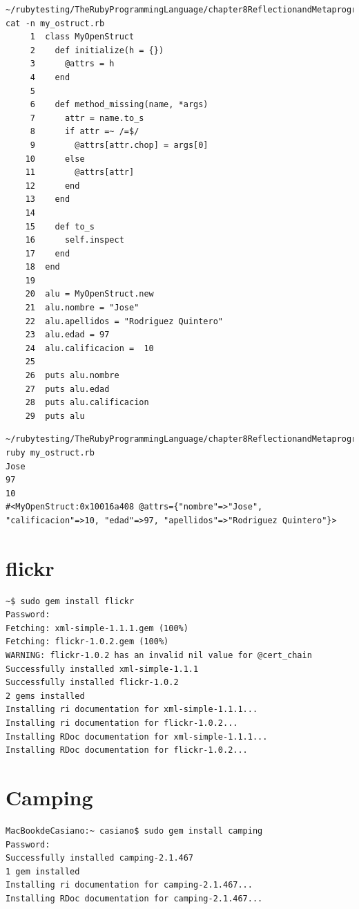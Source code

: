 \begin{verbatim}
~/rubytesting/TheRubyProgrammingLanguage/chapter8ReflectionandMetaprogramming$ cat -n my_ostruct.rb 
     1  class MyOpenStruct
     2    def initialize(h = {})
     3      @attrs = h
     4    end
     5  
     6    def method_missing(name, *args)
     7      attr = name.to_s
     8      if attr =~ /=$/
     9        @attrs[attr.chop] = args[0]
    10      else
    11        @attrs[attr]
    12      end
    13    end
    14  
    15    def to_s
    16      self.inspect
    17    end
    18  end
    19  
    20  alu = MyOpenStruct.new
    21  alu.nombre = "Jose"
    22  alu.apellidos = "Rodriguez Quintero"
    23  alu.edad = 97
    24  alu.calificacion =  10
    25  
    26  puts alu.nombre
    27  puts alu.edad
    28  puts alu.calificacion
    29  puts alu
\end{verbatim}

\begin{verbatim}
~/rubytesting/TheRubyProgrammingLanguage/chapter8ReflectionandMetaprogramming$ ruby my_ostruct.rb 
Jose
97
10
#<MyOpenStruct:0x10016a408 @attrs={"nombre"=>"Jose", "calificacion"=>10, "edad"=>97, "apellidos"=>"Rodriguez Quintero"}>
\end{verbatim}

\section{flickr}

\begin{verbatim}
~$ sudo gem install flickr
Password:
Fetching: xml-simple-1.1.1.gem (100%)
Fetching: flickr-1.0.2.gem (100%)
WARNING: flickr-1.0.2 has an invalid nil value for @cert_chain
Successfully installed xml-simple-1.1.1
Successfully installed flickr-1.0.2
2 gems installed
Installing ri documentation for xml-simple-1.1.1...
Installing ri documentation for flickr-1.0.2...
Installing RDoc documentation for xml-simple-1.1.1...
Installing RDoc documentation for flickr-1.0.2...
\end{verbatim}


%

\section{Camping}
\begin{verbatim}
MacBookdeCasiano:~ casiano$ sudo gem install camping
Password:
Successfully installed camping-2.1.467
1 gem installed
Installing ri documentation for camping-2.1.467...
Installing RDoc documentation for camping-2.1.467...
\end{verbatim}


